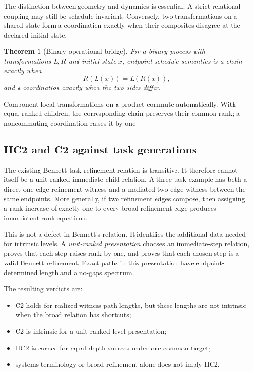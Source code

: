\documentclass[11pt]{article}
\newtheorem{theorem}[definition]{Theorem}
\theoremstyle{remark}
\begin{document}
The distinction between geometry and dynamics is essential.  A strict
relational coupling may still be schedule invariant.  Conversely, two
transformations on a shared state form a coordination exactly when their
composites disagree at the declared initial state.

\begin{theorem}[Binary operational bridge]
For a binary process with transformations $L,R$ and initial state $x$,
endpoint schedule semantics is a chain exactly when
\[
  R(L(x))=L(R(x)),
\]
and a coordination exactly when the two sides differ.
\end{theorem}

Component-local transformations on a product commute automatically.  With
equal-ranked children, the corresponding chain preserves their common rank;
a noncommuting coordination raises it by one.

\subsection{HC2 and C2 against task generations}

The existing Bennett task-refinement relation is transitive.  It therefore
cannot itself be a unit-ranked immediate-child relation.  A three-task example
has both a direct one-edge refinement witness and a mediated two-edge witness
between the same endpoints.  More generally, if two refinement edges compose,
then assigning a rank increase of exactly one to every broad refinement edge
produces inconsistent rank equations.

This is not a defect in Bennett's relation.  It identifies the additional data
needed for intrinsic levels.  A \emph{unit-ranked presentation} chooses an
immediate-step relation, proves that each step raises rank by one, and proves
that each chosen step is a valid Bennett refinement.  Exact paths in this
presentation have endpoint-determined length and a no-gaps spectrum.

The resulting verdicts are:

\begin{itemize}
  \item C2 holds for realized witness-path lengths, but these lengths are not
        intrinsic when the broad relation has shortcuts;
  \item C2 is intrinsic for a unit-ranked level presentation;
  \item HC2 is earned for equal-depth sources under one common target;
  \item systems terminology or broad refinement alone does not imply HC2.
\end{itemize}
\end{document}
